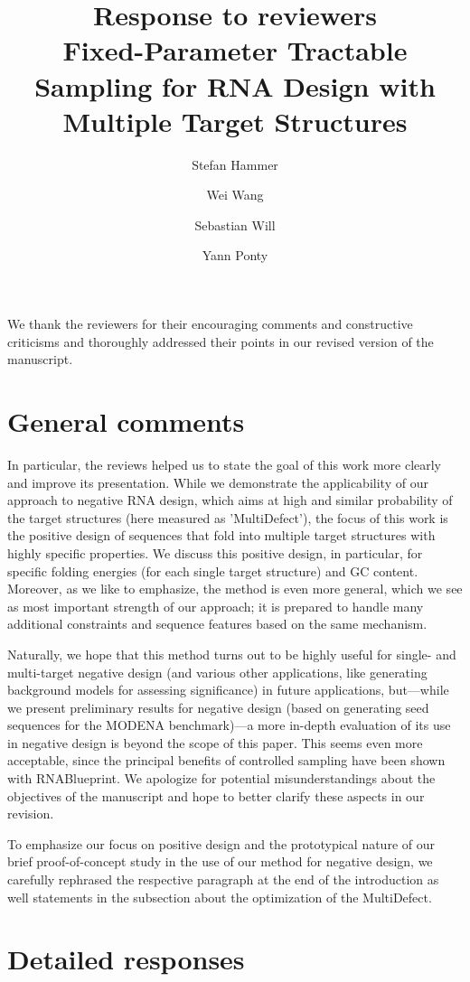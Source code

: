 \documentclass[11pt,hyperref]{article} %
\title{Response to reviewers\\[.3em]Fixed-Parameter Tractable Sampling for RNA Design with Multiple Target Structures}
\author{
Stefan Hammer \and Wei Wang \and Sebastian Will \and Yann Ponty}
\date{} %
\begin{document}
\maketitle

We thank the reviewers for their encouraging comments and constructive criticisms and thoroughly addressed their points in our revised version of the manuscript.

\section{General comments}

In particular, the reviews helped us to state the goal of this work more clearly and improve its presentation. While we demonstrate the applicability of our approach to negative RNA design, which  aims at high and similar probability of the target structures (here measured as 'MultiDefect'), the focus of this work is the positive design of sequences that fold into multiple target structures with highly specific properties. We discuss this positive design, in particular, for specific folding energies (for each single target structure) and GC content. Moreover, as we like to emphasize, the method is even more general, which we see as most important strength of our approach; it is prepared to handle many additional constraints and sequence features based on the same mechanism. 

Naturally, we hope that this method turns out to be highly useful for single- and multi-target negative design (and various other applications, like generating background models for assessing significance) in future applications, but---while we present preliminary results for negative design (based on generating seed sequences for the MODENA benchmark)---a more in-depth evaluation of its use in negative design is beyond the scope of this paper. This seems even more acceptable, since the principal benefits of controlled sampling have been shown with RNABlueprint. We apologize for potential misunderstandings about the objectives of the manuscript and hope to better clarify these aspects in our revision.

To emphasize our focus on positive design and the prototypical nature of our brief proof-of-concept study in the use of our method for negative design, we carefully rephrased the respective paragraph at the end of the introduction as well statements in the subsection about the optimization of the MultiDefect. 


\section{Detailed responses}
\end{document}
